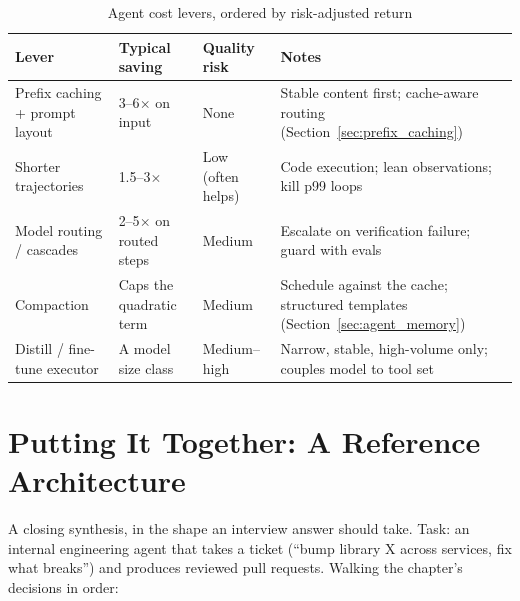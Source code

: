 \begin{table}[H]
\centering
\caption{Agent cost levers, ordered by risk-adjusted return}
\label{tab:cost_levers}
\begin{tabularx}{\textwidth}{p{3.4cm}p{2.8cm}p{2.0cm}X}
\toprule
\textbf{Lever} & \textbf{Typical saving} & \textbf{Quality risk} & \textbf{Notes} \\
\midrule
Prefix caching + prompt layout & 3--6$\times$ on input & None & Stable content first; cache-aware routing (Section~\ref{sec:prefix_caching}) \\
Shorter trajectories & 1.5--3$\times$ & Low (often helps) & Code execution; lean observations; kill p99 loops \\
Model routing / cascades & 2--5$\times$ on routed steps & Medium & Escalate on verification failure; guard with evals \\
Compaction & Caps the quadratic term & Medium & Schedule against the cache; structured templates (Section~\ref{sec:agent_memory}) \\
Distill / fine-tune executor & A model size class & Medium--high & Narrow, stable, high-volume only; couples model to tool set \\
\bottomrule
\end{tabularx}
\end{table}

\section{Putting It Together: A Reference Architecture}
\label{sec:agent_reference_arch}

A closing synthesis, in the shape an interview answer should take. Task: an internal engineering agent that takes a ticket (``bump library X across services, fix what breaks'') and produces reviewed pull requests. Walking the chapter's decisions in order:

